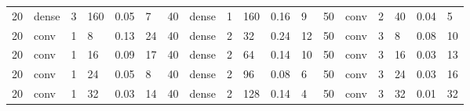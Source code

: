 \begin{table}[t!]
{\begin{tabular}{@{}llllll|llllll|llllll@{}}
20                              & dense                          & 3                              & 160                            & 0.05                             & 7                                 & 40                              & dense                          & 1                              & 160                            & 0.16                           & 9                                 & 50                              & conv                           & 2                              & 40                             & 0.04                           & 5                                \\
20                              & conv                           & 1                              & 8                              & 0.13                             & 24                                & 40                              & dense                          & 2                              & 32                             & 0.24                           & 12                                & 50                              & conv                           & 3                              & 8                              & 0.08                           & 10                               \\
20                              & conv                           & 1                              & 16                             & 0.09                             & 17                                & 40                              & dense                          & 2                              & 64                             & 0.14                           & 10                                & 50                              & conv                           & 3                              & 16                             & 0.03                           & 13                               \\
20                              & conv                           & 1                              & 24                             & 0.05                             & 8                                 & 40                              & dense                          & 2                              & 96                             & 0.08                           & 6                                 & 50                              & conv                           & 3                              & 24                             & 0.03                           & 16                               \\
20                              & conv                           & 1                              & 32                             & 0.03                             & 14                                & 40                              & dense                          & 2                              & 128                            & 0.14                           & 4                                 & 50                              & conv                           & 3                              & 32                             & 0.01                           & 32                               \\

\end{tabular}}
\end{table}
